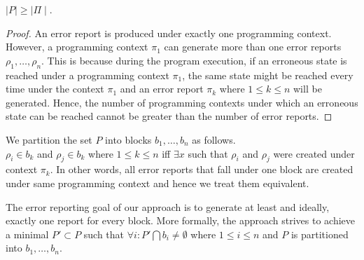 \begin{theorem}
$\mid P\mid \ge \mid \Pi \mid$.
\end{theorem}

\begin{proof}
An error report is produced under exactly one programming context. However, a
programming context $\pi_1$ can generate more than one error reports $\rho_1, \ldots ,\rho_n$. This is because during the program
execution, if an erroneous state is reached under a programming context $\pi_1$, the same state might be reached every time
under the context $\pi_1$ and an error report $\pi_k$ where $1 \le k \le n$ will be generated. Hence, the number of programming
contexts under which an erroneous state can be reached cannot be greater than the number of error reports.
\end{proof}

We partition the set $P$ into blocks $b_1, \ldots , b_n$ as follows. \\
$\rho_i \in b_k$ and $\rho_j \in b_k$ where  $1 \le k \le n$
iff $\exists x$ such that $\rho_i$ and $\rho_j$ were created under context $\pi_k$.
In other words, all error reports that fall under one block are created under same
programming context and hence we treat them equivalent.

The error reporting goal of our approach is to generate at least and ideally, exactly one report
for every block. More formally, the approach strives to achieve a minimal $P' \subset P$
such that $\forall i : P' \bigcap b_i \ne \emptyset$ where $1 \le i \le n$ and $P$ is partitioned into
$b_1, \ldots, b_n$.

